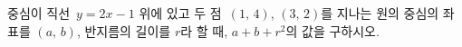 중심이 직선~$y=2x-1$ 위에 있고 두 점~$(1,\,4)$, $(3,\,2)$를 지나는 원의 중심의 좌표를 $(a,\,b)$, 반지름의 길이를 $r$라 할 때, $a+b+r^2$의 값을 구하시오.
